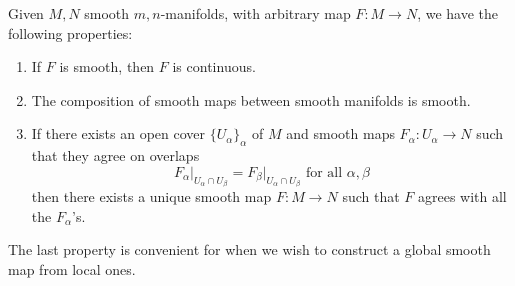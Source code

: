\documentclass{article}
\newcounter{theorem}[section]
\begin{document}
  \begin{theorem}
    \label{thm:properties-of-smooth-maps-between-manifolds}
    Given $M, N$ smooth $m, n$-manifolds, with arbitrary map $F: M \to N$, we have the following properties: 

    \begin{enumerate}
      \item If $F$ is smooth, then $F$ is continuous. 
      \item The composition of smooth maps between smooth manifolds is smooth. 
      \item If there exists an open cover $\{U_\alpha\}_\alpha$ of $M$ and smooth maps $F_\alpha: U_\alpha \to N$ such that they agree on overlaps
        \begin{equation}
          F_\alpha \big|_{U_\alpha \cap U_\beta} = F_\beta \big|_{U_\alpha \cap U_\beta} \text{ for all } \alpha, \beta
        \end{equation}
      then there exists a unique smooth map $F: M \to N$ such that $F$ agrees with all the $F_\alpha$'s. 
    \end{enumerate}

    The last property is convenient for when we wish to construct a global smooth map from local ones. 
  \end{theorem}
\end{document}
